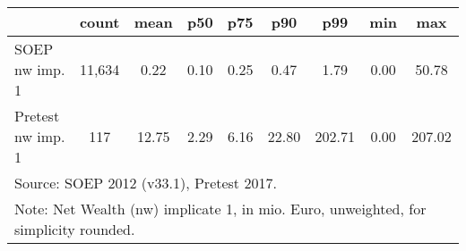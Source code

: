 {
\def\sym#1{\ifmmode^{#1}\else\(^{#1}\)\fi}
\begin{tabular}{l*{1}{cccccccc}}
\hline\hline
                                            &       count&        mean&         p50&         p75&         p90&         p99&         min&         max\\
\hline
SOEP nw imp. 1                              &      11,634&        0.22&        0.10&        0.25&        0.47&        1.79&        0.00&       50.78\\
Pretest nw imp. 1                           &         117&       12.75&        2.29&        6.16&       22.80&      202.71&        0.00&      207.02\\
\hline\hline
\multicolumn{9}{l}{\footnotesize Source: SOEP 2012 (v33.1), Pretest 2017.}\\
\multicolumn{9}{l}{\footnotesize Note: Net Wealth (nw) implicate 1, in mio. Euro, unweighted, for simplicity rounded.}\\
\end{tabular}
}
